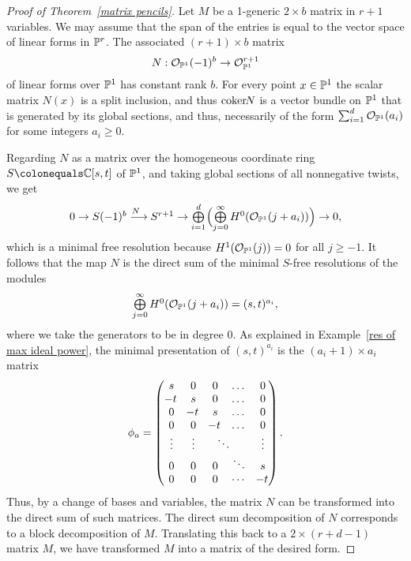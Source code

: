 \begin{proof}[Proof of Theorem~\ref{matrix pencils}]
Let $M$ be a 1-generic $2\times b$ matrix in $r+1$ variables. We may
assume that the span of the entries
is equal to the vector space of linear forms in ${\mathbb P}^{r}$. The associated
$(r+1)\times b$ matrix
$$
N: {\mathcal O}_{{\mathbb P}^{1}}(-1)^{b} \to {\mathcal O}_{{\mathbb P}^{1}}^{r+1}
$$
of linear forms over ${\mathbb P}^{1}$ has constant rank $b$.
For every point $x\in {\mathbb P}^{1}$ the scalar matrix $N(x)$ is a split
inclusion, and thus
$\coker N$ is a vector bundle
%
on ${\mathbb P}^{1}$ that is generated by its global sections, 
and thus, necessarily of the form $\sum_{i
=1}^{d}{\mathcal O}_{{\mathbb P}^{1}}(a_{i})$ for some
integers $a_{i}\geq 0$.

Regarding $N$ as a matrix over the homogeneous coordinate ring $S\colonequals \CC[s,t]$ of ${\mathbb P}^{1}$, and taking global sections of all
nonnegative twists, we get
$$
\tsty
0\to S(-1)^{b} \ruto {\,N}
S^{r+1}  \to \bigoplus\limits_{i = 1}^{d}\,\Bigl(
\bigoplus\limits_{j=0}^{\infty}H^{0}(\sO_{\PP^{1}}(j+a_{i}))\Bigr)\to 0,
$$
which is a minimal free resolution because $H^{1}({\mathcal O}_{{\mathbb P}^{1}}(j)) = 0$ for all $j\geq -1$.
It follows that the map $N$ is the direct
sum of the minimal $S$-free resolutions
of the modules
$$
\textstyle
\bigoplus\limits_{j=0}^{\infty}H^{0}({\mathcal O}_{{\mathbb P}^{1}}(j+a_{i})) = (s,t)^{a_{i}},
$$
where we take the generators to be in degree 0.
As 
explained
in Example~\ref{res of max ideal power}, the minimal
presentation of $(s,t)^{a_{i}}$ is the $(a_{i}+1)\times a_{i}$ matrix
\label{phia}$$
\phi_a=
\left(\,
\begin{matrix}
s&0&0&\dots&0\\
\!-t&s&0&\dots&0\\
0&\!-t&s&\dots&0\\
0&0&\!-t&\dots&0\\
\vdots&\vdots&\rlap{\,$\ddots$}&&\vdots\\
0&0&0&\ddots&s\\
0&0&0&\cdots&\!-t\\
\end{matrix}
\right)
.
$$
 Thus, by a change of bases and variables, the matrix $N$ can be
transformed into the direct sum of such matrices.
The direct sum decomposition of $N$ corresponds to a block decomposition
of $M$. Translating this
back to a $2\times (r+d-1)$ matrix $M$, we have
transformed $M$ into a matrix of
the desired form.
\end{proof}

